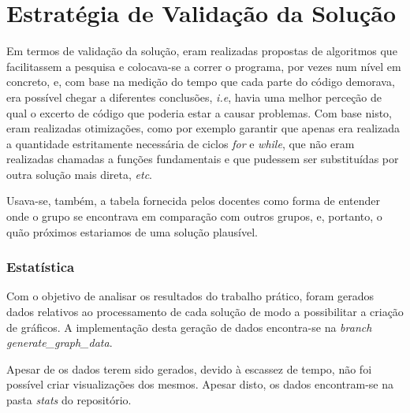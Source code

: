\documentclass[10pt,portuguese]{article}
\begin{document}
\section{Estratégia de Validação da Solução}
\par Em termos de validação da solução, eram realizadas propostas de algoritmos que facilitassem a pesquisa e colocava-se a correr o programa, por vezes num nível em concreto, e, com base na medição do tempo que cada parte do código demorava, era possível chegar a diferentes conclusões, \textit{i.e}, havia uma melhor perceção de qual o excerto de código que poderia estar a causar problemas. Com base nisto, eram realizadas otimizações, como por exemplo garantir que apenas era realizada a quantidade estritamente necessária de ciclos \textit{for} e \textit{while}, que não eram realizadas chamadas a funções fundamentais e que pudessem ser substituídas por outra solução mais direta, \textit{etc}. 
\par Usava-se, também, a tabela fornecida pelos docentes como forma de entender onde o grupo se encontrava em comparação com outros grupos, e, portanto, o quão próximos estariamos de uma solução plausível. 

\subsubsection{Estatística}

\par Com o objetivo de analisar os resultados do trabalho prático, foram gerados dados relativos ao processamento de cada solução de modo a possibilitar a criação de gráficos. A implementação desta geração de dados encontra-se na \textit{branch} \textit{generate\_graph\_data}.

\par Apesar de os dados terem sido gerados, devido à escassez de tempo, não foi possível criar visualizações dos mesmos. Apesar disto, os dados encontram-se na pasta \textit{stats} do repositório.
\end{document}
